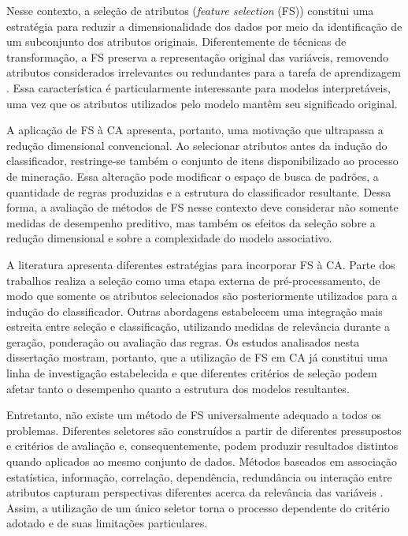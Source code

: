 Nesse contexto, a seleção de atributos (\textit{feature selection} (FS)) constitui uma estratégia para reduzir a dimensionalidade dos dados por meio da identificação de um subconjunto dos atributos originais. Diferentemente de técnicas de transformação, a FS preserva a representação original das variáveis, removendo atributos considerados irrelevantes ou redundantes para a tarefa de aprendizagem \cite{Dhal2022,Theng2024}. Essa característica é particularmente interessante para modelos interpretáveis, uma vez que os atributos utilizados pelo modelo mantêm seu significado original.

A aplicação de FS à CA apresenta, portanto, uma motivação que ultrapassa a redução dimensional convencional. Ao selecionar atributos antes da indução do classificador, restringe-se também o conjunto de itens disponibilizado ao processo de mineração. Essa alteração pode modificar o espaço de busca de padrões, a quantidade de regras produzidas e a estrutura do classificador resultante. Dessa forma, a avaliação de métodos de FS nesse contexto deve considerar não somente medidas de desempenho preditivo, mas também os efeitos da seleção sobre a redução dimensional e sobre a complexidade do modelo associativo.

A literatura apresenta diferentes estratégias para incorporar FS à CA. Parte dos trabalhos realiza a seleção como uma etapa externa de pré-processamento, de modo que somente os atributos selecionados são posteriormente utilizados para a indução do classificador. Outras abordagens estabelecem uma integração mais estreita entre seleção e classificação, utilizando medidas de relevância durante a geração, ponderação ou avaliação das regras. Os estudos analisados nesta dissertação mostram, portanto, que a utilização de FS em CA já constitui uma linha de investigação estabelecida e que diferentes critérios de seleção podem afetar tanto o desempenho quanto a estrutura dos modelos resultantes.

Entretanto, não existe um método de FS universalmente adequado a todos os problemas. Diferentes seletores são construídos a partir de diferentes pressupostos e critérios de avaliação e, consequentemente, podem produzir resultados distintos quando aplicados ao mesmo conjunto de dados. Métodos baseados em associação estatística, informação, correlação, dependência, redundância ou interação entre atributos capturam perspectivas diferentes acerca da relevância das variáveis \cite{KHAIRE20221060,Theng2024}. Assim, a utilização de um único seletor torna o processo dependente do critério adotado e de suas limitações particulares.


